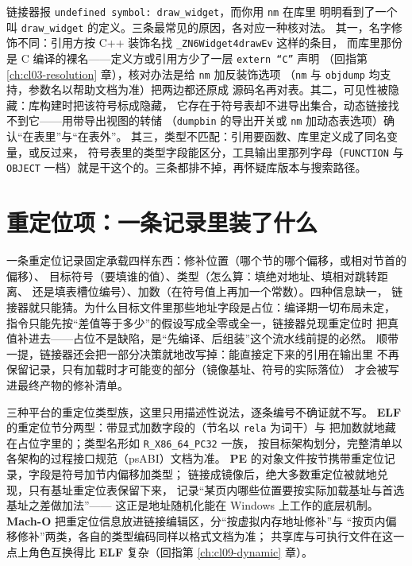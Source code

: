 \documentclass[12pt,a4paper,fontset=fandol]{ctexbook}
\newcommand{\Tp}[1]{\texttt{#1}}
\newcommand{\Lang}[1]{\textsf{#1}}
\newcommand{\CL}{\Lang{C}}
\newcommand{\CPP}{\Lang{C++}}
\newcommand{\Tool}[1]{\texttt{#1}}
\newcommand{\Sw}[1]{\texttt{#1}}
\newcommand{\Sym}[1]{\texttt{#1}}
\newcommand{\Elf}{\textbf{\textsf{ELF}}}
\newcommand{\PeFmt}{\textbf{\textsf{PE}}}
\newcommand{\Macho}{\textbf{\textsf{Mach-O}}}
\newcommand{\Win}{\textsf{Windows}}
\begin{document}
\begin{abibox}[title={“未定义符号”与“符号明明在”}]
链接器报 \Sym{undefined symbol: draw\_widget}，而你用 \Tool{nm} 在库里
明明看到了一个叫 \Sym{draw\_widget} 的定义。三条最常见的原因，各对应一种核对法。
其一，名字修饰不同：引用方按 \CPP{} 装饰名找 \Sym{\_ZN6Widget4drawEv} 这样的条目，
而库里那份是 \CL{} 编译的裸名——定义方或引用方少了一层 \Sw{extern “C”} 声明
（回指第 \ref{ch:cl03-resolution} 章），核对办法是给 \Tool{nm} 加反装饰选项
（\Tool{nm} 与 \Tool{objdump} 均支持，参数名以帮助文档为准）把两边都还原成
源码名再对表。其二，可见性被隐藏：库构建时把该符号标成隐藏，
它存在于符号表却不进导出集合，动态链接找不到它——用带导出视图的转储
（\Tool{dumpbin} 的导出开关或 \Tool{nm} 加动态表选项）确认“在表里”与“在表外”。
其三，类型不匹配：引用要函数、库里定义成了同名变量，或反过来，
符号表里的类型字段能区分，工具输出里那列字母（\Tp{FUNCTION} 与 \Tp{OBJECT}
一档）就是干这个的。三条都排不掉，再怀疑库版本与搜索路径。
\end{abibox}

\section{重定位项：一条记录里装了什么}\label{sec:cl07-reloc}

一条重定位记录固定承载四样东西：修补位置（哪个节的哪个偏移，或相对节首的偏移）、
目标符号（要填谁的值）、类型（怎么算：填绝对地址、填相对跳转距离、
还是填表槽位编号）、加数（在符号值上再加一个常数）。四种信息缺一，
链接器就只能猜。为什么目标文件里那些地址字段是占位：编译期一切布局未定，
指令只能先按“差值等于多少”的假设写成全零或全一，链接器兑现重定位时
把真值补进去——占位不是缺陷，是“先编译、后组装”这个流水线前提的必然。
顺带一提，链接器还会把一部分决策就地改写掉：能直接定下来的引用在输出里
不再保留记录，只有加载时才可能变的部分（镜像基址、符号的实际落位）
才会被写进最终产物的修补清单。

三种平台的重定位类型族，这里只用描述性说法，逐条编号不确证就不写。
\Elf{} 的重定位节分两型：带显式加数字段的（节名以 \Tp{rela} 为词干）与
把加数就地藏在占位字里的；类型名形如 \Sym{R\_X86\_64\_PC32} 一族，
按目标架构划分，完整清单以各架构的过程接口规范（psABI）文档为准。
\PeFmt{} 的对象文件按节携带重定位记录，字段是符号加节内偏移加类型；
链接成镜像后，绝大多数重定位被就地兑现，只有基址重定位表保留下来，
记录“某页内哪些位置要按实际加载基址与首选基址之差做加法”——
这正是地址随机化能在 \Win{} 上工作的底层机制。
\Macho{} 把重定位信息放进链接编辑区，分“按虚拟内存地址修补”与
“按页内偏移修补”两类，各自的类型编码同样以格式文档为准；
共享库与可执行文件在这一点上角色互换得比 \Elf{} 复杂（回指第
\ref{ch:cl09-dynamic} 章）。
\end{document}

